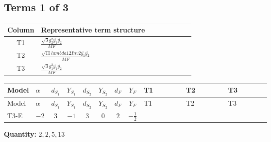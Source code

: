 \documentclass[8pt]{article}
\begin{document}
\begin{landscape}
\subsection*{Terms 1 of 3}
\begin{center}
\begin{tabular}{@{}c >{\raggedright\arraybackslash}p{0.82\linewidth}@{}}
\toprule
Column & Representative term structure \\
\midrule
T1 & \(\displaystyle \frac{\sqrt{3} g_{2}^{2} \overline{y_{1}} \overline{y_{2}}}{MF}\) \\
\midrule
T2 & \(\displaystyle \frac{\sqrt{11} lambda12Inv2 \overline{y_{1}} \overline{y_{2}}}{MF}\) \\
\midrule
T3 & \(\displaystyle \frac{\sqrt{3} g_{1}^{2} \overline{y_{1}} \overline{y_{2}}}{MF}\) \\
\midrule
\bottomrule
\end{tabular}
\end{center}
\smallskip
\tiny
\begin{longtable}{@{}llcccccc >{\raggedright\arraybackslash}p{0.21\linewidth} >{\raggedright\arraybackslash}p{0.21\linewidth} >{\raggedright\arraybackslash}p{0.21\linewidth}@{}}
\toprule
Model & $\alpha$ & $d_{S_1}$ & $Y_{S_1}$ & $d_{S_2}$ & $Y_{S_2}$ & $d_F$ & $Y_F$ & T1 & T2 & T3 \\
\midrule
\endfirsthead
\toprule
Model & $\alpha$ & $d_{S_1}$ & $Y_{S_1}$ & $d_{S_2}$ & $Y_{S_2}$ & $d_F$ & $Y_F$ & T1 & T2 & T3 \\
\midrule
\endhead
T3-E & $-2$ & $3$ & $-1$ & $3$ & $0$ & $2$ & $-\frac{1}{2}$ & \scriptsize\adjustbox{max width=\linewidth}{$\begin{gathered} - \frac{49 \sqrt{3} g_{2}^{2} \overline{y_{1}} \overline{y_{2}}}{24 MF}\end{gathered}$} & \scriptsize\adjustbox{max width=\linewidth}{$\begin{gathered} - \frac{3 \sqrt{11} lambda12Inv2 \overline{y_{1}} \overline{y_{2}}}{22 MF}\end{gathered}$} & \scriptsize\adjustbox{max width=\linewidth}{$\begin{gathered} - \frac{\sqrt{3} g_{1}^{2} \overline{y_{1}} \overline{y_{2}}}{8 MF}\end{gathered}$} \\
\midrule
\bottomrule
\end{longtable}
\clearpage
\noindent\textbf{Quantity: }$\mathrm{2,2,5,13}$\par\smallskip

\end{landscape}
\end{document}
